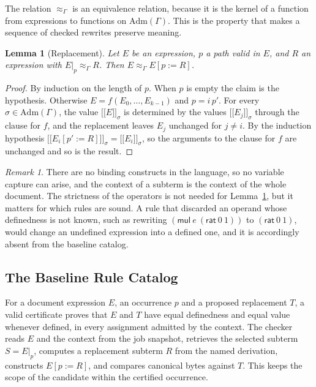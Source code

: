 \documentclass[11pt,a4paper]{article}
\theoremstyle{plain}
\newtheorem{lemma}[theorem]{Lemma}
\theoremstyle{definition}
\theoremstyle{remark}
\newtheorem{remark}[theorem]{Remark}
\theoremstyle{definition}
\newcommand{\den}[2]{\mathopen{[\![}#1\mathclose{]\!]}_{#2}}
\newcommand{\eqv}[1]{\approx_{#1}}
\newcommand{\replace}[3]{#1[#2 \mathbin{:=} #3]}
\begin{document}
The relation $\eqv{\Gamma}$ is an equivalence relation, because it is the kernel of a function from expressions to functions on $\mathrm{Adm}(\Gamma)$. This is the property that makes a sequence of checked rewrites preserve meaning.

\begin{lemma}[Replacement]
\label{lem:replacement}
Let $E$ be an expression, $p$ a path valid in $E$, and $R$ an expression with $E|_p \eqv{\Gamma} R$. Then $E \eqv{\Gamma} \replace{E}{p}{R}$.
\end{lemma}

\begin{proof}
By induction on the length of $p$. When $p$ is empty the claim is the hypothesis. Otherwise $E = f(E_0,\ldots,E_{k-1})$ and $p = i\,p'$. For every $\sigma \in \mathrm{Adm}(\Gamma)$, the value $\den{E}{\sigma}$ is determined by the values $\den{E_j}{\sigma}$ through the clause for $f$, and the replacement leaves $E_j$ unchanged for $j \ne i$. By the induction hypothesis $\den{\replace{E_i}{p'}{R}}{\sigma} = \den{E_i}{\sigma}$, so the arguments to the clause for $f$ are unchanged and so is the result.
\end{proof}

\begin{remark}
There are no binding constructs in the language, so no variable capture can arise, and the context of a subterm is the context of the whole document. The strictness of the operators is not needed for Lemma~\ref{lem:replacement}, but it matters for which rules are sound. A rule that discarded an operand whose definedness is not known, such as rewriting $(\mathsf{mul}\ e\ (\mathsf{rat}\ 0\ 1))$ to $(\mathsf{rat}\ 0\ 1)$, would change an undefined expression into a defined one, and it is accordingly absent from the baseline catalog.
\end{remark}

\subsection{The Baseline Rule Catalog}

For a document expression $E$, an occurrence $p$ and a proposed replacement $T$, a valid certificate proves that $E$ and $T$ have equal definedness and equal value whenever defined, in every assignment admitted by the context. The checker reads $E$ and the context from the job snapshot, retrieves the selected subterm $S = E|_p$, computes a replacement subterm $R$ from the named derivation, constructs $\replace{E}{p}{R}$, and compares canonical bytes against $T$. This keeps the scope of the candidate within the certified occurrence.
\end{document}
